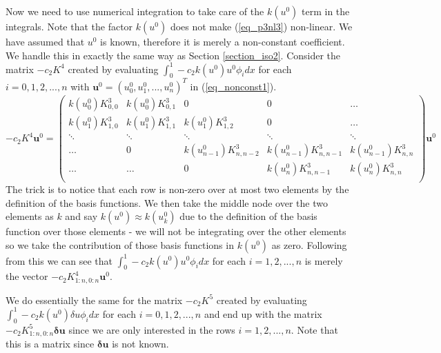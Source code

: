 \documentclass[11pt,fleqn]{article}
\theoremstyle{defstyle}
\begin{document}
Now we need to use numerical integration to take care of the $k(u^0)$ term in the integrals. Note that the factor $k(u^0)$ does not make (\ref{eq_p3nl3}) non-linear. We have assumed that $u^0$ is known, therefore it is merely a non-constant coefficient. We handle this in exactly the same way as Section \ref{section_iso2}. Consider the matrix $-c_2K^4$ created by  evaluating $\int_0^1  -c_2k(u^0)u^0\phi_i dx$ for each $i=0,1,2,...,n$  with $\mathbf{u}^0 = \left(u^0_0,u^0_1,...,u^0_n\right)^T$ in (\ref{eq_nonconst1}).
\begin{equation}
-c_2K^4\mathbf{u}^0 = \begin{pmatrix}
k(u^0_0)K^3_{0,0} & k(u^0_0)K^3_{0,1} & 0 & 0 & \hdots  \\
k(u^0_1)K^3_{1,0} & k(u^0_1)K^3_{1,1} & k(u^0_1)K^3_{1,2} &0& \hdots\\
\ddots & \ddots & \ddots & \ddots & \ddots \\  
\hdots & 0 & k(u^0_{n-1})K^3_{n,n-2} & k(u^0_{n-1})K^3_{n,n-1} & k(u^0_{n-1})K^3_{n,n}\\
\hdots & \hdots & 0 & k(u^0_{n})K^3_{n,n-1} & k(u^0_{n})K^3_{n,n}\\
\end{pmatrix}\mathbf{u}^0
\label{eq_nonconst1}
\end{equation}
The trick is to notice that each row is non-zero over at most two elements by the definition of the basis functions. We then take the middle node over the two elements as $k$ and say $k(u^0) \approx k(u^0_k)$ due to the definition of the basis function over those elements - we will not be integrating over the other elements so we take the contribution of those basis functions in $k(u^0)$ as zero. Following from this we can see that $\int_0^1  -c_2k(u^0)u^0\phi_i dx$ for each $i=1,2,...,n$ is merely the vector $-c_2K^4_{1:n,0:n}\mathbf{u}^0$. 

We do essentially the same for the matrix $-c_2K^5$ created by  evaluating $\int_0^1  -c_2k(u^0)\delta u\phi_i dx$ for each $i=0,1,2,...,n$ and end up with the matrix $-c_2K^5_{1:n,0:n}\mathbf{\delta u}$ since we are only interested in  the rows $i=1,2,...,n$. Note that this is a matrix since $\mathbf{\delta u}$ is not known. 
\end{document}
